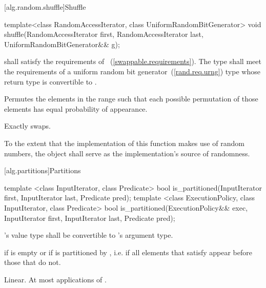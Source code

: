 [alg.random.shuffle]{Shuffle}

%
\begin{itemdecl}
template<class RandomAccessIterator, class UniformRandomBitGenerator>
  void shuffle(RandomAccessIterator first,
               RandomAccessIterator last,
               UniformRandomBitGenerator&& g);
\end{itemdecl}

\begin{itemdescr}
\pnum
\requires
{} shall satisfy the requirements of
~(\ref{swappable.requirements}).
The type
shall meet the requirements of a
uniform random bit generator~(\ref{rand.req.urng}) type whose return type is
convertible to
.

\pnum
\effects
Permutes the elements in the range
such that each possible permutation of those elements has equal probability of appearance.

\pnum
\complexity
Exactly
swaps.

\pnum
\remarks
To the extent that the implementation of this function makes use of random
numbers, the object  shall serve as the implementation's source of
randomness.

\end{itemdescr}

[alg.partitions]{Partitions}

%
\begin{itemdecl}
template <class InputIterator, class Predicate>
  bool is_partitioned(InputIterator first, InputIterator last, Predicate pred);
template <class ExecutionPolicy, class InputIterator, class Predicate>
  bool is_partitioned(ExecutionPolicy&& exec,
                      InputIterator first, InputIterator last, Predicate pred);
\end{itemdecl}

\begin{itemdescr}
\pnum
\requires {}'s value type shall be convertible to 's argument type.

\pnum
\returns {} if
 is empty or if
 is partitioned by , i.e. if all elements that satisfy  appear before those that do not.

\pnum
\complexity Linear. At most  applications of .
\end{itemdescr}

